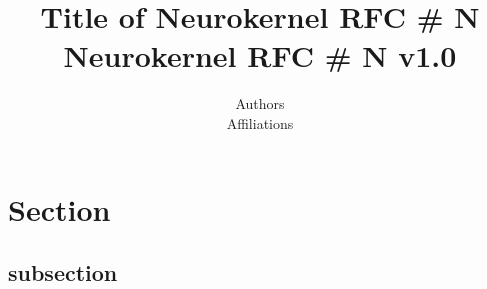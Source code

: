 \documentclass[12pt]{article}
\title{Title of Neurokernel RFC \# N\\
{\large Neurokernel RFC \# N v1.0}
}
\author{Authors\\
Affiliations
}
\begin{document}
\maketitle

\begin{abstract}

\end{abstract}

\newpage
\tableofcontents
\newpage

\section{Section}
\subsection{subsection}

\newpage


\end{document}

